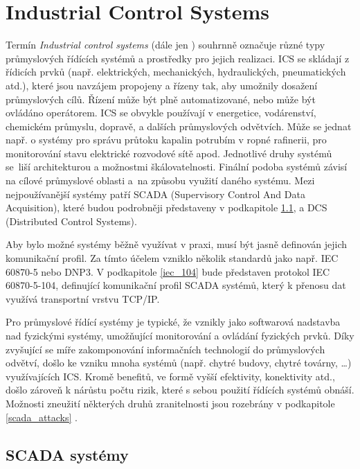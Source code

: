 \chapter{Industrial Control Systems}
\label{chapter_ics}

Termín \textit{Industrial control systems} (dále jen ) souhrnně označuje různé typy průmyslových řídících systémů a prostředky pro jejich realizaci. ICS se skládají z řídicích prvků (např. elektrických, mechanických, hydraulických, pneumatických atd.), které jsou navzájem propojeny a řízeny tak, aby umožnily dosažení průmyslových cílů. Řízení může být plně automatizované, nebo může být ovládáno operátorem. ICS se obvykle používají v energetice, vodárenství, chemickém průmyslu, dopravě, a dalších průmyslových odvětvích. Může se jednat např. o systémy pro správu průtoku kapalin potrubím v ropné rafinerii, pro monitorování stavu elektrické rozvodové sítě apod. Jednotlivé druhy systémů se~liší architekturou a možnostmi škálovatelnosti. Finální podoba systémů závisí na cílové průmyslové oblasti a~na způsobu využití daného systému. Mezi nejpoužívanější systémy patří SCADA (Supervisory Control And Data Acquisition), které budou podrobněji představeny v podkapitole \ref{scada_systems}, a DCS (Distributed Control Systems).

Aby bylo možné systémy běžně využívat v praxi, musí být jasně definován jejich komunikační profil. Za tímto účelem vzniklo několik standardů jako např. IEC 60870-5 nebo DNP3. V podkapitole \ref{iec_104} bude představen protokol IEC 60870-5-104, definující komunikační profil SCADA systémů, který k přenosu dat využívá transportní vrstvu TCP/IP.

Pro průmyslové řídící systémy je typické, že vznikly jako softwarová nadstavba nad fyzickými systémy, umožňující monitorování a ovládání fyzických prvků.  Díky zvyšující se míře zakomponování informačních technologií do průmyslových odvětví, došlo ke vzniku mnoha  systémů (např. chytré budovy, chytré továrny, \dots) využívajících ICS. Kromě benefitů, ve formě vyšší efektivity, konektivity atd., došlo zároveň k nárůstu počtu rizik, které s sebou použití řídících systémů obnáší. Možnosti zneužití některých druhů zranitelnosti jsou rozebrány v podkapitole \ref{scada_attacks} \cite{ics_security}.


\section{SCADA systémy}
\label{scada_systems}

